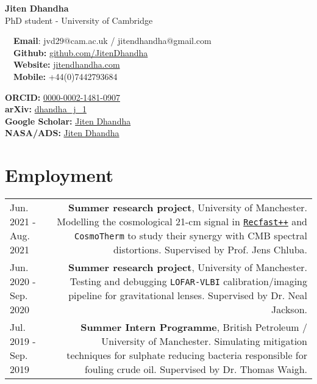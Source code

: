 \documentclass{article}
\begin{document}
\small %

\begin{center}
\huge
\textbf{Jiten Dhandha} \\
\normalsize
PhD student - University of Cambridge \\
\end{center}

\begin{minipage}[ht]{0.6\linewidth}
	\faEnvelope~~\textbf{Email}: jvd29@cam.ac.uk / jitendhandha@gmail.com\\
	\faGithub~~\textbf{Github:} \href{https://github.com/JitenDhandha}{github.com/JitenDhandha}\\
	\faGlobe~~\textbf{Website:} \href{https://jitendhandha.com}{jitendhandha.com} \\
  \faPhone~~\textbf{Mobile:} +44(0)7442793684 \\
\end{minipage}
\begin{minipage}[ht]{0.34\linewidth}
	\begin{flushright}
    \textbf{ORCID:} \href{https://orcid.org/0000-0002-1481-0907}{0000-0002-1481-0907} \\
    \textbf{arXiv:} \href{https://arxiv.org/a/dhandha_j_1.html}{dhandha\_j\_1} \\
    \textbf{Google Scholar:} \href{https://scholar.google.com/citations?user=RjlmcA0AAAAJ}{Jiten Dhandha} \\
    \textbf{NASA/ADS:} \href{https://ui.adsabs.harvard.edu/search/?q=author%3A%22Dhandha%2C+Jiten%22}{Jiten Dhandha} \\
	\end{flushright}
\end{minipage}

\section*{Employment}

\begin{tabular}{L!{\vrule}R}
    Jun. 2021 - Aug. 2021 & \textbf{Summer research project}, University of Manchester. Modelling the cosmological 21-cm signal in \href{https://bitbucket.org/Jacetoto/recfast-.vx/src/Recfast_JD_21cm_modelling/}{\texttt{Recfast++}} and \texttt{CosmoTherm} to study their synergy with CMB spectral distortions. Supervised by Prof. Jens Chluba. \\
    Jun. 2020 - Sep. 2020 & \textbf{Summer research project}, University of Manchester. Testing and debugging \texttt{LOFAR-VLBI} calibration/imaging pipeline for gravitational lenses. Supervised by Dr. Neal Jackson.\\
    Jul. 2019 - Sep. 2019 & \textbf{Summer Intern Programme}, British Petroleum / University of Manchester. Simulating mitigation techniques for sulphate reducing bacteria responsible for fouling crude oil. Supervised by Dr. Thomas Waigh. \\
\end{tabular}
\end{document}
